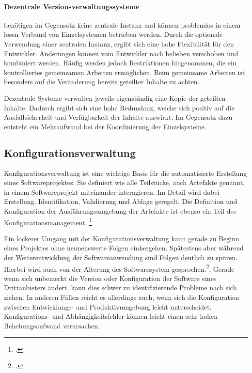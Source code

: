 \paragraph{Dezentrale Versionsverwaltungssysteme} benötigen im Gegensatz keine zentrale Instanz und können problemlos in 
einem losen Verbund von Einzelsystemen betrieben werden. 
Durch die optionale Verwendung einer zentralen Instanz, ergibt sich eine hohe Flexibilität für den Entwickler. Änderungen 
können vom Entwickler nach belieben verschoben und kombiniert werden.
Häufig werden jedoch Restriktionen hingenommen, die ein kontrolliertes gemeinsamen Arbeiten ermöglichen. Beim gemeinsame 
Arbeiten ist besonders auf die Veränderung bereits geteilter Inhalte zu achten.
 
Dezentrale Systeme verwalten jeweils eigenständig eine Kopie der geteilten Inhalte. Dadurch ergibt sich eine hohe 
Redundanz, welche sich positiv auf die Ausfallsicherheit und Verfügbarkeit der Inhalte auswirkt. Im Gegensatz dazu 
entsteht ein Mehraufwand bei der Koordinierung der Einzelsysteme.

\subsection{Konfigurationsverwaltung}
\label{subsec:konfigurationsverwaltung}

Konfigurationsverwaltung ist eine wichtige Basis für die automatisierte Erstellung eines Softwareprojektes. Sie definiert 
wie alle Teilstücke, auch Artefakte genannt, in einem Softwareprojekt miteinander interagieren. Im Detail wird dabei 
Erstellung, Identifikation, Validierung und Ablage geregelt. Die Definition und Konfiguration der Ausführungsumgebung der 
Artefakte ist ebenso ein Teil des Konfigurationsmanagement. \footcite{humble2010}

Ein lockerer Umgang mit der Konfigurationsverwaltung kann gerade zu Beginn eines Projektes ohne nennenswerte Folgen 
einhergehen. Spätestens aber während der Weiterentwicklung der Softwareanwendung sind Folgen deutlich zu spüren. Hierbei 
wird auch von der Alterung des Softwaresystem gesprochen.\footcite{software-quality2008}. Gerade wenn sich unbemerkt die 
Version oder Konfiguration der Software eines Drittanbieters ändert, kann dies schwer zu identifizierende Probleme nach 
sich ziehen. In anderen Fällen reicht es allerdings auch, wenn sich die Konfiguration zwischen Entwicklungs- und 
Produktivumgebung leicht unterscheidet. Konfigurations- und Abhängigkeitsfehler können leicht einen sehr hohen 
Behebungsaufwand verursachen.

